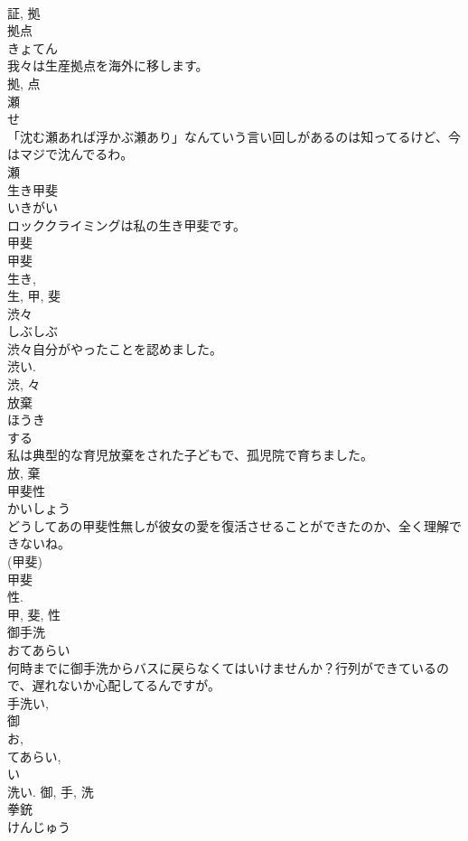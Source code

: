 \documentclass[8pt]{extreport}
\begin{document}
\begin{CJK}{UTF8}{min}
\\	証, 拠	
\\	拠点	
\\	きょてん	
\\	我々は生産拠点を海外に移します。	
\\	拠, 点	
\\	瀬	
\\	せ	
\\	「沈む瀬あれば浮かぶ瀬あり」なんていう言い回しがあるのは知ってるけど、今はマジで沈んでるわ。	
\\	瀬	
\\	生き甲斐	
\\	いきがい	
\\	ロッククライミングは私の生き甲斐です。	
\\	甲斐 
\\	甲斐 
\\	生き, 
\\	生, 甲, 斐	
\\	渋々	
\\	しぶしぶ	
\\	渋々自分がやったことを認めました。	
\\	渋い. 
\\	渋, 々	
\\	放棄	
\\	ほうき	
\\	する 
\\	私は典型的な育児放棄をされた子どもで、孤児院で育ちました。	
\\	放, 棄	
\\	甲斐性	
\\	かいしょう	
\\	どうしてあの甲斐性無しが彼女の愛を復活させることができたのか、全く理解できないね。	
\\	(甲斐) 
\\	甲斐 
\\	性. 
\\	甲, 斐, 性	
\\	御手洗	
\\	おてあらい	
\\	何時までに御手洗からバスに戻らなくてはいけませんか？行列ができているので、遅れないか心配してるんですが。	
\\	手洗い, 
\\	御 
\\	お, 
\\	てあらい, 
\\	い 
\\	洗い.	御, 手, 洗	
\\	拳銃	
\\	けんじゅう	

\end{CJK}
\end{document}
